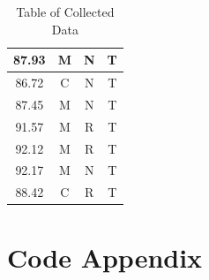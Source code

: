 \documentclass[paper=a4, fontsize=11pt]{scrartcl} %
\numberwithin{equation}{section} %
\numberwithin{figure}{section} %
\numberwithin{table}{section} %
\begin{document}
\begin{table}[H]
\begin{tabular}{|c|c|c|c|}
		87.93              & M               & N                          & T                      \\ \hline
		86.72              & C               & N                          & T                      \\ \hline
		87.45              & M               & N                          & T                      \\ \hline
		91.57              & M               & R                          & T                      \\ \hline
		92.12              & M               & R                          & T                      \\ \hline
		92.17              & M               & N                          & T                      \\ \hline
		88.42              & C               & R                          & T                      \\ \hline
	\end{tabular}
	\caption*{Table of Collected Data}
\end{table}

\newpage
\section*{Code Appendix}

\end{document}
